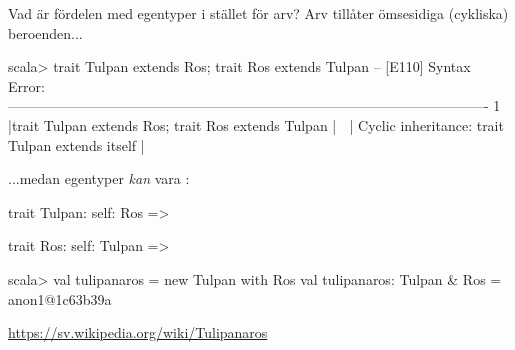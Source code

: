 \begin{Slide}{Vad är fördelen med egentyper i stället för arv?}
\SlideFontSmall
Arv tillåter  ömsesidiga (cykliska) beroenden...

\begin{REPLsmall}
scala> trait Tulpan extends Ros; trait Ros extends Tulpan
-- [E110] Syntax Error: -------------------------------------------------------------------------------------------------------
1 |trait Tulpan extends Ros; trait Ros extends Tulpan
  |                     ^^^
  |                     Cyclic inheritance: trait Tulpan extends itself
  |
\end{REPLsmall}

\vspace{0.5em}
...medan egentyper \emph{kan} vara :
\begin{Code}
trait Tulpan: 
  self: Ros => 

trait Ros:
  self: Tulpan => 
\end{Code}

\begin{REPLnonum}
scala> val tulipanaros = new Tulpan with Ros
val tulipanaros: Tulpan & Ros = anon1@1c63b39a
\end{REPLnonum}
\url{https://sv.wikipedia.org/wiki/Tulipanaros}
\end{Slide}




